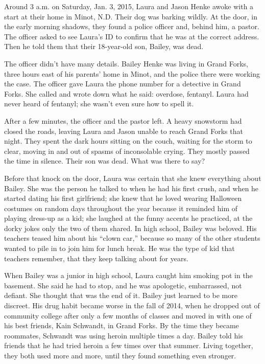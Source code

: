 Around 3 a.m. on Saturday, Jan. 3, 2015, Laura and Jason Henke awoke
with a start at their home in Minot, N.D. Their dog was barking wildly.
At the door, in the early morning shadows, they found a police officer
and, behind him, a pastor. The officer asked to see Laura's ID to
confirm that he was at the correct address. Then he told them that their
18-year-old son, Bailey, was dead.

The officer didn't have many details. Bailey Henke was living in Grand
Forks, three hours east of his parents' home in Minot, and the police
there were working the case. The officer gave Laura the phone number for
a detective in Grand Forks. She called and wrote down what he said:
overdose, fentanyl. Laura had never heard of fentanyl; she wasn't even
sure how to spell it.

After a few minutes, the officer and the pastor left. A heavy snowstorm
had closed the roads, leaving Laura and Jason unable to reach Grand
Forks that night. They spent the dark hours sitting on the couch,
waiting for the storm to clear, moving in and out of spasms of
inconsolable crying. They mostly passed the time in silence. Their son
was dead. What was there to say?

Before that knock on the door, Laura was certain that she knew
everything about Bailey. She was the person he talked to when he had his
first crush, and when he started dating his first girlfriend; she knew
that he loved wearing Halloween costumes on random days throughout the
year because it reminded him of playing dress-up as a kid; she laughed
at the funny accents he practiced, at the dorky jokes only the two of
them shared. In high school, Bailey was beloved. His teachers teased him
about his ``clown car,'' because so many of the other students wanted to
pile in to join him for lunch break. He was the type of kid that
teachers remember, that they keep talking about for years.

When Bailey was a junior in high school, Laura caught him smoking pot in
the basement. She said he had to stop, and he was apologetic,
embarrassed, not defiant. She thought that was the end of it. Bailey
just learned to be more discreet. His drug habit became worse in the
fall of 2014, when he dropped out of community college after only a few
months of classes and moved in with one of his best friends, Kain
Schwandt, in Grand Forks. By the time they became roommates, Schwandt
was using heroin multiple times a day. Bailey told his friends that he
had tried heroin a few times over that summer. Living together, they
both used more and more, until they found something even stronger.

